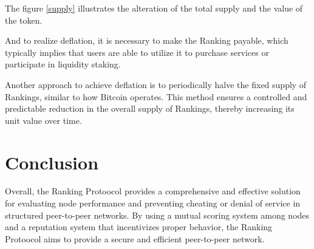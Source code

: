 \documentclass[twocolumn]{article}
\begin{document}
The figure \ref{supply} illustrates the alteration of the total supply and the value of the token.

And to realize deflation, it is necessary to make the Ranking payable, which typically implies that users are able to utilize it to purchase services or participate in liquidity staking.

Another approach to achieve deflation is to periodically halve the fixed supply of Rankings, similar to how Bitcoin operates. This method ensures a controlled and predictable reduction in the overall supply of Rankings, thereby increasing its unit value over time.


\section{Conclusion}
Overall, the Ranking Protoocol provides a comprehensive and effective solution for evaluating node performance and preventing cheating or denial of service in structured peer-to-peer networks. By using a mutual scoring system among nodes and a reputation system that incentivizes proper behavior, the Ranking Protoocol aims to provide a secure and efficient peer-to-peer network.


\end{document}
